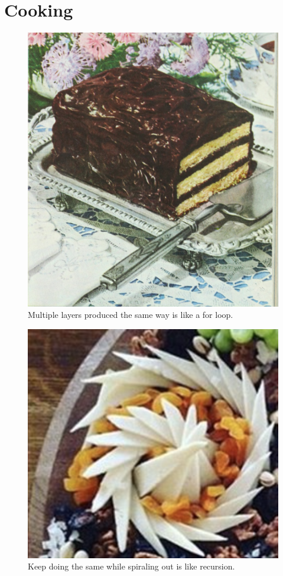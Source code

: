 \documentclass[]{report}
\begin{document}
\section{Cooking}
\begin{figure}
	\centering
	\includegraphics[width=0.7\linewidth]{eachLayerThe_Ladies'_home_journal_(1948)_(14580736777)}
	\caption{Multiple layers produced the same way is like a for loop.}
	\label{fig:eachlayertheladieshomejournal194814580736777}
\end{figure}



\begin{figure}
	\centering
	\includegraphics[width=0.7\linewidth]{spiralRecursion}
	\caption{Keep doing the same while spiraling out is like recursion.}
	\label{fig:spiralrecursion}
\end{figure}
\end{document}
